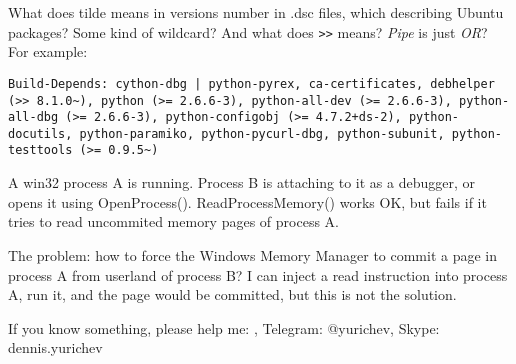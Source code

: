 \myhrule{}

What does tilde means in versions number in .dsc files, which describing Ubuntu packages?
Some kind of wildcard?
And what does \verb|>>| means?
\emph{Pipe} is just \emph{OR}?
For example:

\begin{lstlisting}
Build-Depends: cython-dbg | python-pyrex, ca-certificates, debhelper (>> 8.1.0~), python (>= 2.6.6-3), python-all-dev (>= 2.6.6-3), python-all-dbg (>= 2.6.6-3), python-configobj (>= 4.7.2+ds-2), python-docutils, python-paramiko, python-pycurl-dbg, python-subunit, python-testtools (>= 0.9.5~)
\end{lstlisting}

\myhrule{}

A win32 process A is running.
Process B is attaching to it as a debugger, or opens it using OpenProcess().
ReadProcessMemory() works OK, but fails if it tries to read uncommited memory pages of process A.

The problem: how to force the Windows Memory Manager to commit a page in process A from userland of process B?
I can inject a read instruction into process A, run it, and the page would be committed, but this is not the solution.

\myhrule{}

If you know something, please help me: \EMAIL{}, Telegram: @yurichev, Skype: dennis.yurichev

